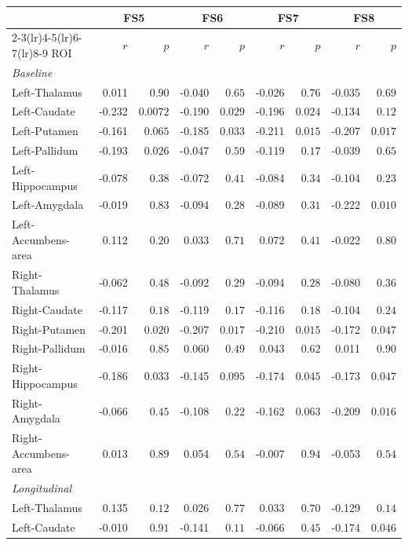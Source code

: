 \begin{tabular}{lrrrrrrrr}
\toprule
 & \multicolumn{2}{c}{FS5} & \multicolumn{2}{c}{FS6} & \multicolumn{2}{c}{FS7} & \multicolumn{2}{c}{FS8} \\
\cmidrule(lr){2-3}\cmidrule(lr){4-5}\cmidrule(lr){6-7}\cmidrule(lr){8-9}
ROI & $r$ & $p$ & $r$ & $p$ & $r$ & $p$ & $r$ & $p$ \\
\midrule
\multicolumn{9}{l}{\textit{Baseline}} \\
Left-Thalamus & 0.011 & $0.90$ & -0.040 & $0.65$ & -0.026 & $0.76$ & -0.035 & $0.69$ \\
Left-Caudate & -0.232 & $0.0072$ & -0.190 & $0.029$ & -0.196 & $0.024$ & -0.134 & $0.12$ \\
Left-Putamen & -0.161 & $0.065$ & -0.185 & $0.033$ & -0.211 & $0.015$ & -0.207 & $0.017$ \\
Left-Pallidum & -0.193 & $0.026$ & -0.047 & $0.59$ & -0.119 & $0.17$ & -0.039 & $0.65$ \\
Left-Hippocampus & -0.078 & $0.38$ & -0.072 & $0.41$ & -0.084 & $0.34$ & -0.104 & $0.23$ \\
Left-Amygdala & -0.019 & $0.83$ & -0.094 & $0.28$ & -0.089 & $0.31$ & -0.222 & $0.010$ \\
Left-Accumbens-area & 0.112 & $0.20$ & 0.033 & $0.71$ & 0.072 & $0.41$ & -0.022 & $0.80$ \\
Right-Thalamus & -0.062 & $0.48$ & -0.092 & $0.29$ & -0.094 & $0.28$ & -0.080 & $0.36$ \\
Right-Caudate & -0.117 & $0.18$ & -0.119 & $0.17$ & -0.116 & $0.18$ & -0.104 & $0.24$ \\
Right-Putamen & -0.201 & $0.020$ & -0.207 & $0.017$ & -0.210 & $0.015$ & -0.172 & $0.047$ \\
Right-Pallidum & -0.016 & $0.85$ & 0.060 & $0.49$ & 0.043 & $0.62$ & 0.011 & $0.90$ \\
Right-Hippocampus & -0.186 & $0.033$ & -0.145 & $0.095$ & -0.174 & $0.045$ & -0.173 & $0.047$ \\
Right-Amygdala & -0.066 & $0.45$ & -0.108 & $0.22$ & -0.162 & $0.063$ & -0.209 & $0.016$ \\
Right-Accumbens-area & 0.013 & $0.89$ & 0.054 & $0.54$ & -0.007 & $0.94$ & -0.053 & $0.54$ \\
\midrule
\multicolumn{9}{l}{\textit{Longitudinal}} \\
Left-Thalamus & 0.135 & $0.12$ & 0.026 & $0.77$ & 0.033 & $0.70$ & -0.129 & $0.14$ \\
Left-Caudate & -0.010 & $0.91$ & -0.141 & $0.11$ & -0.066 & $0.45$ & -0.174 & $0.046$ \\

\end{tabular}
